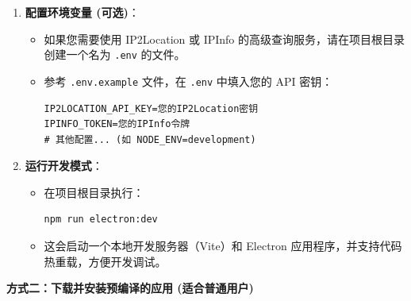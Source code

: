 \documentclass{article}
\begin{document}
\begin{enumerate}[label=\arabic*.]
    \item \textbf{配置环境变量 (可选)}：
    \begin{itemize}
        \item 如果您需要使用 IP2Location 或 IPInfo 的高级查询服务，请在项目根目录创建一个名为 \texttt{.env} 的文件。
        \item 参考 \texttt{.env.example} 文件，在 \texttt{.env} 中填入您的 API 密钥：
        \begin{verbatim}
IP2LOCATION_API_KEY=您的IP2Location密钥
IPINFO_TOKEN=您的IPInfo令牌
# 其他配置... (如 NODE_ENV=development)
        \end{verbatim}
    \end{itemize}

    \item \textbf{运行开发模式}：
    \begin{itemize}
        \item 在项目根目录执行：
        \begin{verbatim}
npm run electron:dev
        \end{verbatim}
        \item 这会启动一个本地开发服务器（Vite）和 Electron 应用程序，并支持代码热重载，方便开发调试。
    \end{itemize}
\end{enumerate}

\textbf{方式二：下载并安装预编译的应用 (适合普通用户)}
\end{document}
